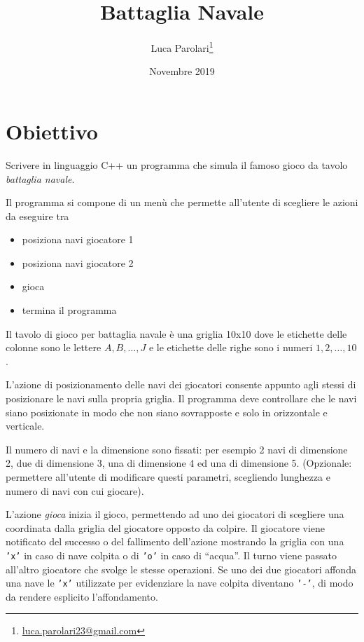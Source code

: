\documentclass[11pt,a4paper]{article}
\author{
	Luca Parolari\thanks{\href{mailto:luca.parolari23@gmail.com}{luca.parolari23@gmail.com}}}
\title{Battaglia Navale}
\date{Novembre 2019}
\begin{document}
	
	\maketitle
	
	\section{Obiettivo}
	
	Scrivere in linguaggio C++ un programma che simula il famoso gioco da tavolo \emph{battaglia navale}. 
	
	Il programma si compone di un menù che permette all'utente di scegliere le azioni da eseguire tra
	\begin{itemize}
		\item posiziona navi giocatore 1
		\item posiziona navi giocatore 2
		\item gioca
		\item termina il programma
	\end{itemize}
	
	Il tavolo di gioco per battaglia navale è una griglia 10x10 dove le etichette delle colonne sono le lettere $A, B, \ldots, J$ e le etichette delle righe sono i numeri $1, 2, \ldots, 10$.
	
	L'azione di posizionamento delle navi dei giocatori consente appunto agli stessi di posizionare le navi sulla propria griglia. Il programma deve controllare che le navi siano posizionate in modo che non siano sovrapposte e solo in orizzontale e verticale.
	
	Il numero di navi e la dimensione sono fissati: per esempio 2 navi di dimensione 2, due di dimensione 3, una di dimensione 4 ed una di dimensione 5. (Opzionale: permettere all'utente di modificare questi parametri, scegliendo lunghezza e numero di navi con cui giocare).
	
	L'azione \emph{gioca} inizia il gioco, permettendo ad uno dei giocatori di scegliere una coordinata dalla griglia del giocatore opposto da colpire. Il giocatore viene notificato del successo o del fallimento dell'azione mostrando la griglia con una \texttt{'x'} in caso di nave colpita o di \texttt{'o'} in caso di ``acqua''. Il turno viene passato all'altro giocatore che svolge le stesse operazioni. Se uno dei due giocatori affonda una nave le \texttt{'x'} utilizzate per evidenziare la nave colpita diventano \texttt{'-'}, di modo da rendere esplicito l'affondamento.
\end{document}
